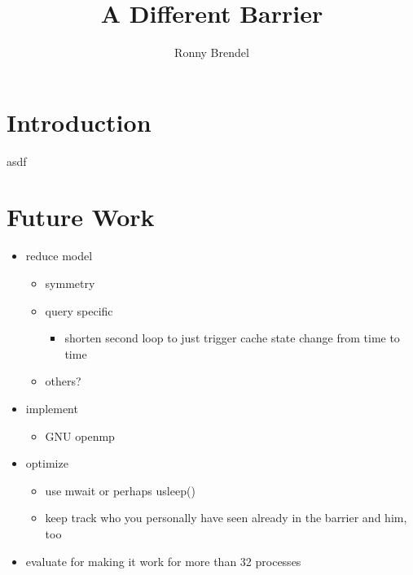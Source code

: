 \documentclass[a4paper, 10pt]{article}
\title{A Different Barrier}
\author{Ronny Brendel}
\begin{document}
\maketitle

\begin{abstract}
\end{abstract}

\section{Introduction}
asdf

\section{Future Work}
\begin{itemize}
	\item reduce model
		\begin{itemize}
		\item symmetry
		\item query specific
			\begin{itemize}
				\item shorten second loop to just trigger cache state change from time to time
			\end{itemize}
		\item others?
		\end{itemize}
	\item implement
		\begin{itemize}
			\item GNU openmp
		\end{itemize}
	\item optimize
		\begin{itemize}
			\item use mwait or perhaps usleep()
			\item keep track who you personally have seen already in the barrier and him, too
		\end{itemize}
	\item evaluate for making it work for more than 32 processes
\end{itemize}


\nocite{*} %

{}
\end{document}
